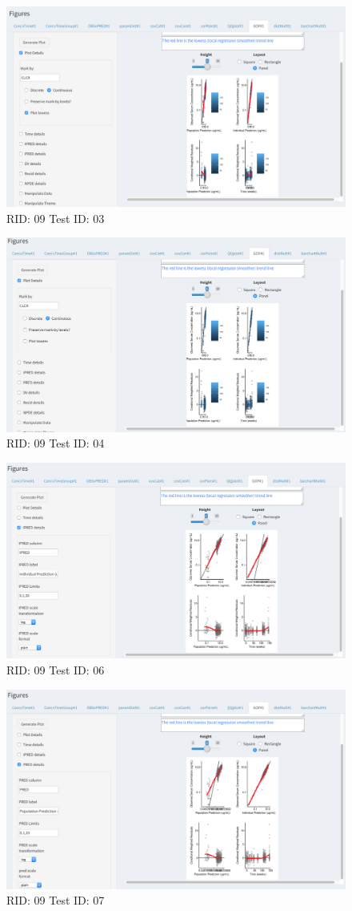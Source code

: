 \begin{figure}[H]
\includegraphics[width=.8\textwidth]{screencaps/09-03-1.png}
\caption{RID: 09 Test ID: 03}
\end{figure}
\begin{figure}[H]
\includegraphics[width=.8\textwidth]{screencaps/09-04-1.png}
\caption{RID: 09 Test ID: 04}
\end{figure}
\begin{figure}[H]
\includegraphics[width=.8\textwidth]{screencaps/09-06-1.png}
\caption{RID: 09 Test ID: 06}
\end{figure}
\begin{figure}[H]
\includegraphics[width=.8\textwidth]{screencaps/09-07-1.png}
\caption{RID: 09 Test ID: 07}
\end{figure}

